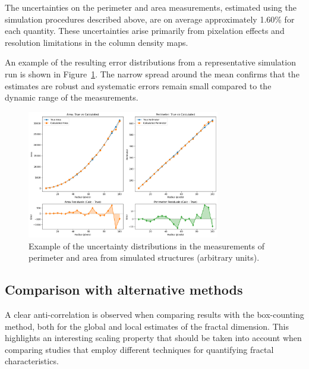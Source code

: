 The uncertainties on the perimeter and area measurements, estimated using the simulation procedures described above, are on average approximately 1.60\% for each quantity. These uncertainties arise primarily from pixelation effects and resolution limitations in the column density maps.  

An example of the resulting error distributions from a representative simulation run is shown in Figure~\ref{fig:uncertainties}. The narrow spread around the mean confirms that the estimates are robust and systematic errors remain small compared to the dynamic range of the measurements.

\begin{figure}[t]
    \centering
    \includegraphics[width=0.75\textwidth]{figures/perimeter_area_uncertainties.png}
    \caption{Example of the uncertainty distributions in the measurements of perimeter and area from simulated structures (arbitrary units).}
    \label{fig:uncertainties}
\end{figure}

\subsection{Comparison with alternative methods}

A clear anti-correlation is observed when comparing results with the box-counting method, both for the global and local estimates of the fractal dimension. This highlights an interesting scaling property that should be taken into account when comparing studies that employ different techniques for quantifying fractal characteristics.
